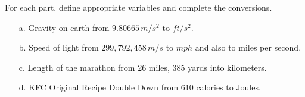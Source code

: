 {For each part, define appropriate variables and complete the conversions.
\begin{enumerate}
\item[a.] Gravity on earth from $9.80665 \, m/s^2$ to $ft/s^2$.
\item[b.] Speed of light from $299,792,458 \, m/s$ to $mph$ and also to miles per second.
\item[c.] Length of the marathon from 26 miles, 385 yards into kilometers.
\item[d.] KFC Original Recipe Double Down from 610 calories to Joules.
\end{enumerate}}
{}